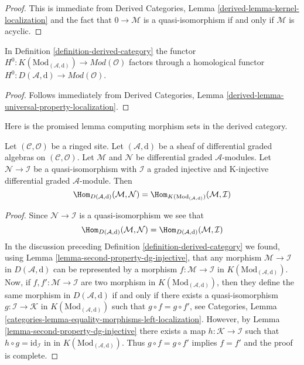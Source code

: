 \begin{proof}
This is immediate from
Derived Categories, Lemma \ref{derived-lemma-kernel-localization}
and the fact that $0 \to \mathcal{M}$ is a quasi-isomorphism
if and only if $\mathcal{M}$ is acyclic.
\end{proof}

\begin{lemma}
\label{lemma-H0-over-D}
In Definition \ref{definition-derived-category} the functor
$H^0 : K(\text{Mod}_{(\mathcal{A}, \text{d})}) \to
\textit{Mod}(\mathcal{O})$ factors through a homological functor
$H^0 : D(\mathcal{A}, \text{d}) \to \textit{Mod}(\mathcal{O})$.
\end{lemma}

\begin{proof}
Follows immediately from
Derived Categories, Lemma \ref{derived-lemma-universal-property-localization}.
\end{proof}

\noindent
Here is the promised lemma computing morphism sets in the
derived category.

\begin{lemma}
\label{lemma-hom-derived}
Let $(\mathcal{C}, \mathcal{O})$ be a ringed site. Let
$(\mathcal{A}, \text{d})$ be a sheaf of differential graded algebras
on $(\mathcal{C}, \mathcal{O})$.
Let $\mathcal{M}$ and $\mathcal{N}$ be differential graded
$\mathcal{A}$-modules. Let $\mathcal{N} \to \mathcal{I}$ be a
quasi-isomorphism with $\mathcal{I}$ a graded injective and
K-injective differential graded $\mathcal{A}$-module. Then
$$
\Hom_{D(\mathcal{A}, \text{d})}(\mathcal{M}, \mathcal{N}) =
\Hom_{K(\text{Mod}_{(\mathcal{A}, \text{d})})}(\mathcal{M}, \mathcal{I})
$$
\end{lemma}

\begin{proof}
Since $\mathcal{N} \to \mathcal{I}$ is a quasi-isomorphism
we see that
$$
\Hom_{D(\mathcal{A}, \text{d})}(\mathcal{M}, \mathcal{N}) =
\Hom_{D(\mathcal{A}, \text{d})}(\mathcal{M}, \mathcal{I})
$$
In the discussion preceding Definition \ref{definition-derived-category}
we found, using Lemma \ref{lemma-second-property-dg-injective},
that any morphism $\mathcal{M} \to \mathcal{I}$
in $D(\mathcal{A}, \text{d})$ can be represented by a morphism
$f : \mathcal{M} \to \mathcal{I}$ in
$K(\text{Mod}_{(\mathcal{A}, \text{d})})$.
Now, if $f, f' :  \mathcal{M} \to \mathcal{I}$ are two morphism in
$K(\text{Mod}_{(\mathcal{A}, \text{d})})$, then they define
the same morphism in $D(\mathcal{A}, \text{d})$ if and only
if there exists a quasi-isomorphism $g : \mathcal{I} \to \mathcal{K}$
in $K(\text{Mod}_{(\mathcal{A}, \text{d})})$
such that $g \circ f = g \circ f'$, see
Categories, Lemma \ref{categories-lemma-equality-morphisms-left-localization}.
However, by Lemma \ref{lemma-second-property-dg-injective} there
exists a map
$h : \mathcal{K} \to \mathcal{I}$
such that $h \circ g = \text{id}_\mathcal{I}$ in
in $K(\text{Mod}_{(\mathcal{A}, \text{d})})$.
Thus $g \circ f = g \circ f'$ implies $f = f'$ and
the proof is complete.
\end{proof}

